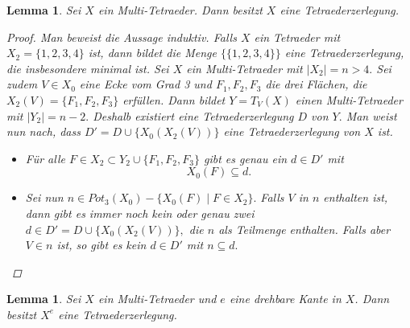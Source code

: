 \documentclass[12pt,titlepage,twoside,cleardoublepage]{article}
\theoremstyle{nummermitklammern}
\newtheorem{lemma}[temp]{Lemma}
\newtheorem{lemma}[zahl]{Lemma}
\numberwithin{equation}{section}
\begin{document}
\begin{lemma}\label{zerlegung}
Sei $X$ ein Multi-Tetraeder. Dann besitzt $X$ eine Tetraederzerlegung. 
\begin{proof}
Man beweist die Aussage induktiv. Falls $X$ ein Tetraeder mit $X_2=\{1,2,3,4\}$ ist, dann bildet die Menge $\{\{1,2,3,4\}\}$ eine Tetraederzerlegung, die insbesondere minimal ist.
Sei $X$ ein Multi-Tetraeder mit $\vert X_2\vert =n > 4.$ Sei zudem $V\in X_0$ eine Ecke vom Grad 3 und $F_1,F_2,F_3$ die drei Flächen, die $X_2(V)=\{F_1,F_2,F_3\}$ erfüllen.  Dann bildet $Y=T_V(X)$ einen Multi-Tetraeder mit $\vert Y_2 \vert =n-2.$ Deshalb existiert eine Tetraederzerlegung $D$ von $Y.$ Man weist nun nach, dass $D'=D\cup \{X_0(X_2(V))\}$ eine Tetraederzerlegung von $X$ ist.
\begin{itemize}
\item Für alle $F\in X_2\subset Y_2\cup \{F_1,F_2,F_3\}$ gibt es genau ein $d\in D'$ mit 
\[
X_0(F)\subseteq d.
\] 
\item Sei nun $n\in Pot_3(X_0)-\{X_0(F)\mid F\in X_2\}.$ Falls $V$ in $n$ enthalten ist, 
dann gibt es immer noch kein oder genau zwei $d\in D'=D\cup \{X_0(X_2(V))\},$ die $n$ als Teilmenge enthalten. Falls aber $V\in n$ ist, so gibt es kein $d\in D'$ mit $n\subseteq d.$
\end{itemize}
\end{proof}
\end{lemma}
  \begin{lemma}\label{tzer}
 Sei $X$ ein Multi-Tetraeder und $e$ eine drehbare Kante in $X$. Dann besitzt $X^e$ eine Tetraederzerlegung. 
 \end{lemma}
\end{document}
